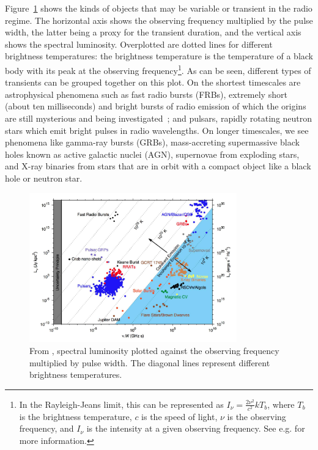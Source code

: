 \documentclass[12pt]{article}
\begin{document}
Figure~\ref{dario_var_lum} \citep{2015MNRAS.446.3687P} shows the kinds of objects that may be variable or transient in the radio regime. The horizontal axis shows the observing frequency multiplied by the pulse width, the latter being a proxy for the transient duration, and the vertical axis shows the spectral luminosity. Overplotted are dotted lines for different brightness temperatures: the brightness temperature is the temperature of a black body with its peak at the observing frequency\footnote{In the Rayleigh-Jeans limit, this can be represented as $I_{\nu}=\frac{2\nu^2}{c^2}kT_b$, where $T_b$ is the brightness temperature, $c$ is the speed of light, $\nu$ is the observing frequency, and $I_{\nu}$ is the intensity at a given observing frequency. See e.g. \citet{1986rpa..book.....R} for more information.}. As can be seen, different types of transients can be grouped together on this plot. On the shortest timescales are astrophysical phenomena such as fast radio bursts (FRBs), extremely short (about ten milliseconds) and bright bursts of radio emission of which the origins are still mysterious and being investigated~\citep{2021ApJS..257...59C}; and pulsars, rapidly rotating neutron stars which emit bright pulses in radio wavelengths. On longer timescales, we see phenomena like gamma-ray bursts (GRBs), mass-accreting supermassive black holes known as active galactic nuclei (AGN), supernovae from exploding stars, and X-ray binaries from stars that are in orbit with a compact object like a black hole or neutron star. 

	\begin{figure}
		\begin{center}
			\includegraphics[width=0.8\textwidth]{dario_var_lum.png}
			\caption{From \cite{2015MNRAS.446.3687P}, spectral luminosity plotted against the observing frequency multiplied by pulse width. The diagonal lines represent different brightness temperatures.}
			\label{dario_var_lum}	
		\end{center}
	\end{figure}
\end{document}
